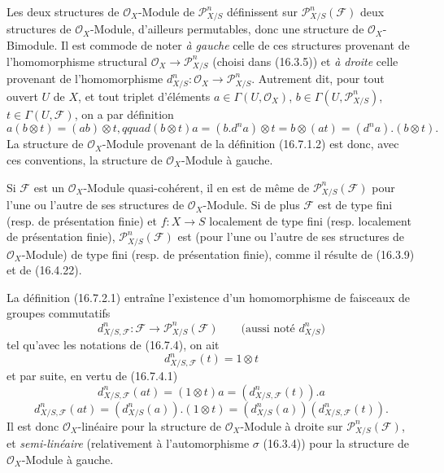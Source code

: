 \begin{env}[16.7.4]
\label{IV.16.7.4}
Les deux structures de $\mathcal{O}_X$-Module de $\mathscr{P}_{X/S}^n$
définissent sur $\mathscr{P}_{X/S}^n(\mathscr{F})$ deux structures de
$\mathcal{O}_X$-Module, d'ailleurs permutables, donc une structure de
$\mathcal{O}_X$-Bimodule. Il est commode de noter \emph{à gauche} celle de
ces structures provenant de l'homomorphisme structural
$\mathcal{O}_X\to\mathscr{P}_{X/S}^n$ (choisi dans (16.3.5)) et
\emph{à droite} celle provenant de l'homomorphisme
$d_{X/S}^n:\mathcal{O}_X\to\mathscr{P}_{X/S}^n$. Autrement dit, pour tout
ouvert $U$ de $X$, et tout triplet d'éléments
$a\in\Gamma(U,\mathcal{O}_X)$, $b\in\Gamma(U,\mathscr{P}_{X/S}^n)$,
$t\in\Gamma(U,\mathscr{F})$, on a par définition
\[
  a(b\otimes t)=(ab)\otimes t,qquad
  (b\otimes t)a=(b.d^na)\otimes t=b\otimes(at)
  =(d^na).(b\otimes t).
  \tag{16.7.4.1}
  \label{IV.16.7.4.1}
\]
La structure de $\mathcal{O}_X$-Module provenant de la définition (16.7.1.2)
est donc, avec ces conventions, la structure de $\mathcal{O}_X$-Module à
gauche.

Si $\mathscr{F}$ est un $\mathcal{O}_X$-Module quasi-cohérent, il en est de
même de $\mathscr{P}_{X/S}^n(\mathscr{F})$ pour l'une ou l'autre de ses
structures de $\mathcal{O}_X$-Module. Si de plus $\mathscr{F}$ est de type
fini (resp. de présentation finie) et $f:X\to S$ localement de type fini
(resp. localement de présentation finie),
$\mathscr{P}_{X/S}^n(\mathscr{F})$ est (pour l'une ou l'autre de ses
structures de $\mathcal{O}_X$-Module) de type fini (resp. de présentation
finie), comme il résulte de (16.3.9) et de (16.4.22).
\end{env}

\begin{env}[16.7.5]
\label{IV.16.7.5}
La définition (16.7.2.1) entraîne l'existence d'un homomorphisme de faisceaux
de groupes commutatifs
\[
  d_{X/S,\mathscr{F}}^n:\mathscr{F}
  \longrightarrow\mathscr{P}_{X/S}^n(\mathscr{F})
  \qquad\text{(aussi noté $d_{X/S}^n$)}
  \tag{16.7.5.1}
  \label{IV.16.7.5.1}
\]
tel qu'avec les notations de (16.7.4), on ait
\[
  d_{X/S,\mathscr{F}}^n(t)=1\otimes t
  \tag{16.7.5.2}
  \label{IV.16.7.5.2}
\]
et par suite, en vertu de (16.7.4.1)
\[
  d_{X/S,\mathscr{F}}^n(at)
  =(1\otimes t)a=(d_{X/S,\mathscr{F}}^n(t)).a
  \tag{16.7.5.3}
  \label{IV.16.7.5.3}
\]
\[
  d_{X/S,\mathscr{F}}^n(at)
  =(d_{X/S}^n(a)).(1\otimes t)
  =(d_{X/S}^n(a))(d_{X/S,\mathscr{F}}^n(t)).
  \tag{16.7.5.4}
  \label{IV.16.7.5.4}
\]
Il est donc $\mathcal{O}_X$-linéaire pour la structure de
$\mathcal{O}_X$-Module à droite sur $\mathscr{P}_{X/S}^n(\mathscr{F})$, et
\emph{semi-linéaire} (relativement à l'automorphisme $\sigma$ (16.3.4)) pour
la structure de $\mathcal{O}_X$-Module à gauche.
\end{env}

